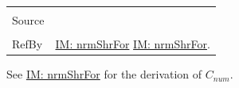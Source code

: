 \documentclass[12pt]{article}
\begin{document}
\begin{minipage}{\textwidth}
\begin{tabular}{p{} p{}}
                                                                                                   \\ \midrule \\
                                                                                                   Source & \cite{chen2005}
                                                                                                            \\ \midrule \\
                                                                                                            RefBy & \hyperref[IM:nrmShrFor]{IM: nrmShrFor} \hyperref[IM:nrmShrFor]{IM: nrmShrFor}.
\\ \bottomrule \end{tabular}
\end{minipage}
See \hyperref[IM:nrmShrFor]{IM: nrmShrFor} for the derivation of ${C_{num}}$.
\par~
\end{document}
